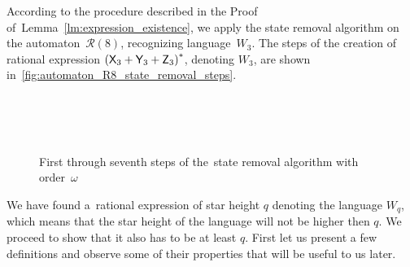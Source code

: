 \begin{example}
    According to the procedure described in the Proof of~Lemma~\ref*{lm:expression_existence}, we apply the state removal algorithm on the automaton~${\mathcal{R}(8)}$, recognizing language~$W_3$. The steps of the creation of rational expression ${({\mathsf{X}}_3 + {\mathsf{Y}}_3 + {\mathsf{Z}}_3)}^*$, denoting $W_3$, are shown in~\autoref*{fig:automaton_R8_state_removal_steps}. 

    \begin{figure}%
        \centering
        \hspace{-20pt}%
        \subfloat[][]{\label{fig:automaton_R8_state_removal_steps-a}%
            }%
        \hspace{70pt}%
        \subfloat[][]{\label{fig:automaton_R8_state_removal_steps-b}%
            }\\
        \subfloat[][]{\label{fig:automaton_R8_state_removal_steps-c}%
            }%
        \hspace{8pt}%
        \subfloat[][]{\label{fig:automaton_R8_state_removal_steps-d}%
            }\\
        \subfloat[][]{\label{fig:automaton_R8_state_removal_steps-e}%
            }\\
        \subfloat[][]{\label{fig:automaton_R8_state_removal_steps-f}%
            }%
        \hspace{40pt}%
        \subfloat[][]{\label{fig:automaton_R8_state_removal_steps-g}%
            }%
        \caption{First through seventh steps of the~state removal algorithm with order~$\omega$}\label{fig:automaton_R8_state_removal_steps}%
    \end{figure}
\end{example}

We have found a~rational expression of star height $q$ denoting the language $W_q$, which means that the star height of the language will not be higher then $q$. We proceed to show that it also has to be at least $q$. First let us present a few definitions and observe some of their properties that will be useful to us later.

